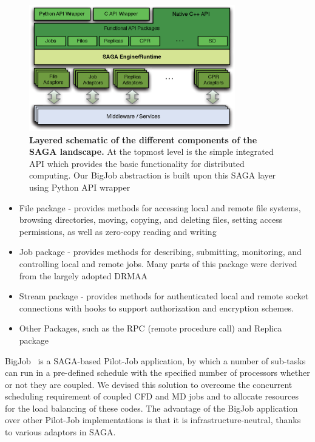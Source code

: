 \documentclass[preprint,12pt]{elsarticle}
\begin{document}
\begin{figure}
 \begin{center}
     \includegraphics[width=0.8\textwidth]{Structure_of_SAGA.eps}
 \end{center}
\caption{\small {\bf Layered schematic of the different components of the SAGA landscape.} At the topmost level is the simple integrated API which provides the basic functionality for distributed computing. Our BigJob abstraction is built upon this SAGA layer using Python API wrapper}
 \label{Fig:SAGA1}
 \vspace{-1em}
\end{figure}

\begin{itemize}
\item File package - provides methods for accessing local and remote file systems, browsing directories, moving, copying, and deleting files, setting access permissions, as well as zero-copy reading and writing
\item Job package - provides methods for describing, submitting, monitoring, and controlling local and remote jobs. Many parts of this package were derived from the largely adopted DRMAA %
\item Stream package - provides methods for authenticated local and remote socket connections with hooks to support authorization and encryption schemes.
\item Other Packages, such as the RPC (remote procedure call) and Replica package
\end{itemize}


BigJob~\cite{repex_ptrsa} is a SAGA-based Pilot-Job application, by which a number of sub-tasks can run in a pre-defined schedule with the specified number of processors whether or not they are coupled. We devised this solution to overcome the concurrent scheduling requirement of coupled CFD and MD jobs and to allocate resources for the load balancing of these codes. The advantage of the BigJob application over other Pilot-Job implementations is that it is infrastructure-neutral, thanks to various adaptors in SAGA.
\end{document}
